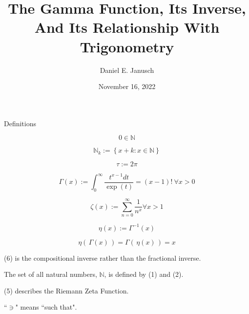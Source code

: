 \documentclass[12pt]{article}
\begin{document}
\title{The Gamma Function, Its Inverse, And Its Relationship With Trigonometry}
\author{Daniel E. Janusch}
\date{November 16, 2022} %
\maketitle

\begin{section}{Definitions}

	\begin{equation}
		0\in\mathbb N
	\end{equation}

	\begin{equation}
		\mathbb N_k:=\left\{x+k:x\in\mathbb N\right\}
	\end{equation}

	\begin{equation}
		\tau:=2\pi
	\end{equation}

	\begin{equation}
		\Gamma(x):=\int_0^\infty\dfrac{t^{x-1}dt}{\exp\left(t\right)}=(x-1)!~\forall x>0
	\end{equation}

	\begin{equation}
		\zeta(x):=\sum_{n=0}^\infty\dfrac1{n^x}\forall x>1
	\end{equation}

	\begin{equation}
		\eta(x):=\Gamma^{-1}(x)
	\end{equation}

	\begin{equation}
		\eta(\,\Gamma(x)\,)=\Gamma(\,\eta(x)\,)=x
	\end{equation}

	(6) is the compositional inverse rather than the fractional inverse.

	The set of all natural numbers, $\mathbb N$, is defined by (1) and (2).

	(5) describes the Riemann Zeta Function.

	``$\ni$" means ``such that".
\end{section}
\end{document}
